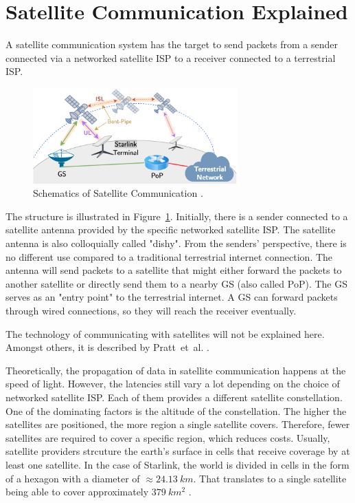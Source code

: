 \section{Satellite Communication Explained} \label{sec:satellite-communication-explained}

A satellite communication system has the target to send packets from a sender
connected via a networked satellite ISP to a receiver connected to a terrestrial
ISP.

\begin{figure}[!ht]
	\centering
	\includegraphics[width=0.7\textwidth]{./chapters/2-background/img/satcom-structure-mohan.png}
	\caption{Schematics of Satellite Communication \cite{DBLP:conf/www/MohanFCBRMO24}.}
	\label{fig:sat-com-explained}
\end{figure}

The structure is illustrated in Figure~\ref{fig:sat-com-explained}.
Initially, there is a sender connected to a satellite antenna provided by the
specific networked satellite ISP. The satellite antenna is also colloquially
called "dishy". From the senders' perspective, there is no different use
compared to a traditional terrestrial internet connection. The antenna will
send packets to a satellite that might either forward the packets to another
satellite or directly send them to a nearby \ac{GS} (also called \ac{PoP}). The
\ac{GS} serves as an "entry point" to the terrestrial internet. A \ac{GS} can
forward packets through wired connections, so they will reach the receiver
eventually.

The technology of communicating with satellites will not be explained here.
Amongst others, it is described by Pratt~et~al. \cite{pratt2019satellite}.

Theoretically, the propagation of data in satellite communication happens at
the speed of light. However, the latencies still vary a lot depending on the
choice of networked satellite ISP. Each of them provides a different satellite
constellation. One of the dominating factors is the altitude of the
constellation. The higher the satellites are positioned, the more region a
single satellite covers. Therefore, fewer satellites are required to cover a
specific region, which reduces costs. Usually, satellite providers strcuture
the earth's surface in cells that receive coverage by at least one satellite.
In the case of Starlink, the world is divided in cells in the form of a hexagon
with a diameter of $\approx 24.13~km$. That translates to a single satellite
being able to cover approximately $379~km^2$ \cite{Pekhterev2021}.

